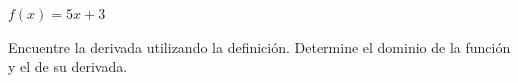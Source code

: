 \item $f(x) = 5x + 3$
\par
Encuentre la derivada utilizando la definición. Determine el dominio de la función y el de su derivada.
